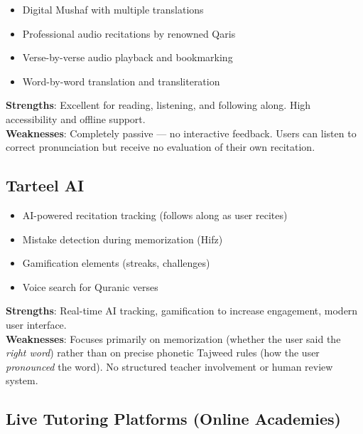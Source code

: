 \begin{infobox}[title=Key Features of Quran.com]
\begin{itemize}
  \item Digital Mushaf with multiple translations
  \item Professional audio recitations by renowned Qaris
  \item Verse-by-verse audio playback and bookmarking
  \item Word-by-word translation and transliteration
\end{itemize}
\end{infobox}

\textbf{Strengths}: Excellent for reading, listening, and following along. High accessibility and offline support.\\
\textbf{Weaknesses}: Completely passive --- no interactive feedback. Users can listen to correct pronunciation but receive no evaluation of their own recitation.

\subsection{Tarteel AI}

\begin{infobox}[title=Key Features of Tarteel AI]
\begin{itemize}
  \item AI-powered recitation tracking (follows along as user recites)
  \item Mistake detection during memorization (Hifz)
  \item Gamification elements (streaks, challenges)
  \item Voice search for Quranic verses
\end{itemize}
\end{infobox}

\textbf{Strengths}: Real-time AI tracking, gamification to increase engagement, modern user interface.\\
\textbf{Weaknesses}: Focuses primarily on memorization (whether the user said the \textit{right word}) rather than on precise phonetic Tajweed rules (how the user \textit{pronounced} the word). No structured teacher involvement or human review system.

\subsection{Live Tutoring Platforms (Online Academies)}

